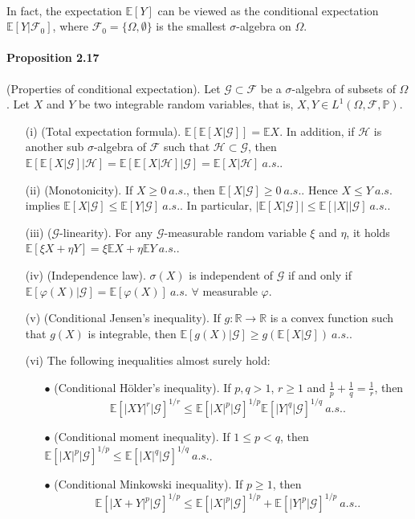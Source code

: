 \documentclass{article}
\numberwithin{equation}{section}
\newcommand{\E}{\mathbb{E}}
\theoremstyle{plain}
\theoremstyle{definition}
\begin{document}
\paragraph{} In fact, the expectation $\E[Y]$ can be viewed as the conditional expectation $\E[Y|\mathscr{F}_0]$, where $\mathscr{F}_0=\{\Omega,\emptyset\}$ is the smallest $\sigma$-algebra on $\Omega$.

\paragraph{Proposition 2.17\label{prop:2.17}} (Properties of conditional expectation). Let $\mathscr{G}\subset\mathscr{F}$ be a $\sigma$-algebra of subsets of $\Omega$. Let $X$ and $Y$ be two integrable random variables, that is, $X,Y\in L^1(\Omega,\mathscr{F},\mathbb{P})$. 
\begin{itemize}
	\item[(i)] (Total expectation formula). $\E\left[\E\left[X|\mathscr{G}\right]\right]=\E X$. In addition, if $\mathscr{H}$ is another sub $\sigma$-algebra of $\mathscr{F}$ such that $\mathscr{H}\subset\mathscr{G}$, then $\E\left[\E\left[X|\mathscr{G}\right]|\mathscr{H}\right]=\E\left[\E\left[X|\mathscr{H}\right]|\mathscr{G}\right]=\E[X|\mathscr{H}]\ a.s.$.
	\item[(ii)] (Monotonicity). If $X\geq 0\ a.s.$, then $\E[X|\mathscr{G}]\geq 0\ a.s.$. Hence $X\leq Y\ a.s.$ implies $\E[X|\mathscr{G}]\leq\E[Y|\mathscr{G}]\ a.s.$. In particular, $\left\vert\E[X|\mathscr{G}]\right\vert\leq\E[\left\vert X\right\vert|\mathscr{G}]\ a.s.$.
	\item[(iii)] ($\mathscr{G}$-linearity). For any $\mathscr{G}$-measurable random variable $\xi$ and $\eta$, it holds $\E[\xi X+\eta Y]=\xi\E X + \eta\E Y\ a.s.$.
	\item[(iv)] (Independence law). $\sigma(X)$ is independent of $\mathscr{G}$ if and only if $\E[\varphi(X)|\mathscr{G}]=\E[\varphi(X)]\ a.s.$ $\forall$ measurable $\varphi$.
	\item[(v)] (Conditional Jensen's inequality). If $g:\mathbb{R}\to\mathbb{R}$ is a convex function such that $g(X)$ is integrable, then $\E[g(X)|\mathscr{G}]\geq g\left(\E[X|\mathscr{G}]\right)\ a.s.$.
	\item[(vi)] The following inequalities almost surely hold:
	\begin{itemize}
		\item[$\bullet$] (Conditional Hölder's inequality). If $p,q>1$, $r\geq 1$ and $\frac{1}{p}+\frac{1}{q}=\frac{1}{r}$, then $$\E\left[\vert XY\vert^r|\mathscr{G}\right]^{1/r}\leq\E\left[\vert X\vert^p|\mathscr{G}\right]^{1/p}\E\left[\vert Y\vert^q|\mathscr{G}\right]^{1/q}\ a.s..$$
		\item[$\bullet$] (Conditional moment inequality). If $1\leq p < q$, then $\E\left[\vert X\vert^p|\mathscr{G}\right]^{1/p}\leq\E\left[\vert X\vert^q|\mathscr{G}\right]^{1/q}\ a.s.$.
		\item[$\bullet$] (Conditional Minkowski inequality). If $p\geq 1$, then $$\E\left[\vert X+Y\vert^p|\mathscr{G}\right]^{1/p}\leq\E\left[\vert X\vert^p|\mathscr{G}\right]^{1/p}+\E\left[\vert Y\vert^p|\mathscr{G}\right]^{1/p}\ a.s..$$
	\end{itemize}
\end{itemize}
\end{document}
